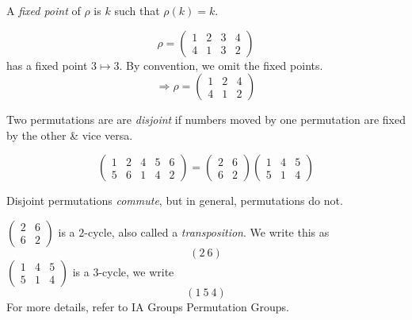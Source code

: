 \documentclass{article}
\numberwithin{equation}{section}
\begin{document}
\begin{defi}
    A \emph{fixed point} of $\rho$ is $k$ such that $\rho(k) = k$.
    \begin{eg}
        \[
            \rho = \begin{pmatrix}
                1 & 2 & 3 & 4 \\
                4 & 1 & 3 & 2
            \end{pmatrix}
        \]
        has a fixed point $3 \mapsto 3$. By convention, we omit the fixed points.
        \[
            \Rightarrow \rho = \begin{pmatrix}
                1 & 2 & 4 \\
                4 & 1 & 2
            \end{pmatrix}
        \]
    \end{eg}
\end{defi}

\begin{defi}[Disjoint]
    Two permutations are are \emph{disjoint} if numbers moved by one permutation are fixed by the other \& vice versa.
\end{defi}
\begin{eg}
    \[
        \begin{pmatrix}
            1 & 2 & 4 & 5 & 6 \\
            5 & 6 & 1 & 4 & 2
        \end{pmatrix} 
        = 
        \begin{pmatrix}
            2 & 6 \\
            6 & 2
        \end{pmatrix}
        \begin{pmatrix}
            1 & 4 & 5 \\
            5 & 1 & 4
        \end{pmatrix}
    \]
\end{eg}
\begin{remark}
    Disjoint permutations \emph{commute}, but in general, permutations do not.
\end{remark}

\begin{defi}[Cycles]
    $\begin{pmatrix}
        2 & 6 \\
        6 & 2
    \end{pmatrix}$ is a $2$-cycle, also called a \emph{transposition}. We write this as
    \[
        (2\ 6)  
    \]
    $\begin{pmatrix}
        1 & 4 & 5 \\
        5 & 1 & 4
    \end{pmatrix}$ is a $3$-cycle, we write
    \[
        (1\ 5\ 4)  
    \]
    For more details, refer to IA Groups Permutation Groups.
\end{defi}
\end{document}
